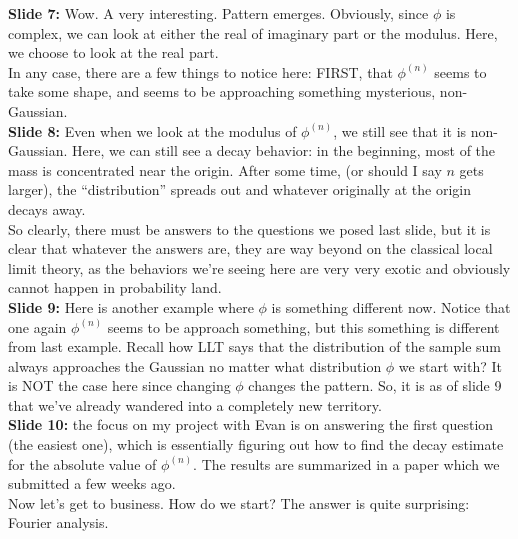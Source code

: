 \documentclass[11pt]{article}
\begin{document}
\noindent \textbf{Slide 7:} Wow. A very interesting.  Pattern emerges. Obviously, since $\phi$ is complex, we can look at either the real of imaginary part or the modulus. Here, we choose to look at the real part. \\

In any case, there are a few things to notice here: FIRST, that $\phi^{(n)}$ seems to take some shape, and seems to be approaching something mysterious, non-Gaussian. \\


\noindent \textbf{Slide 8:} Even when we look at the modulus of $\phi^{(n)}$, we still see that it is non-Gaussian. Here, we can still see a decay behavior: in the beginning, most of the mass is concentrated near the origin. After some time, (or should I say $n$ gets larger), the ``distribution'' spreads out and whatever originally at the origin decays away. \\


So clearly, there must be answers to the questions we posed last slide, but it is clear that whatever the answers are, they are way beyond on the classical local limit theory, as the behaviors we're seeing here are very very exotic and obviously cannot happen in probability land. \\



\noindent \textbf{Slide 9:} Here is another example where $\phi$ is something different now.
Notice that one again $\phi^{(n)}$ seems to be approach something, but this something is different from last example. Recall how LLT says that the distribution of the sample sum always approaches the Gaussian no matter what distribution $\phi$ we start with? It is NOT the case here since changing $\phi$ changes the pattern. So, it is as of slide 9 that we've already wandered into a completely new territory.\\




\noindent \textbf{Slide 10:}  the focus on my project with Evan is on answering the first question (the easiest one), which is essentially figuring out how to find the decay estimate for the absolute value of $\phi^{(n)}$. The results are summarized in a paper which we submitted a few weeks ago.\\


Now let's get to business. How do we start? The answer is quite surprising: Fourier analysis.\\


\newpage
\end{document}
